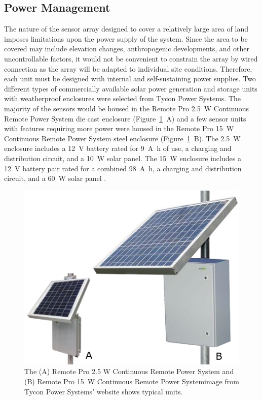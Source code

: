 \documentclass[journal]{IEEEtran}
\begin{document}
\subsection{Power Management}
The nature of the sensor array designed to cover a relatively large area of land imposes limitations upon the power supply of the system.  Since the area to be covered may include elevation changes, anthropogenic developments, and other uncontrollable factors, it would not be convenient to constrain the array by wired connection as the array will be adapted to individual site conditions.  Therefore, each unit must be designed with internal and self-sustaining power supplies.  Two different types of commercially available solar power generation and storage units with weatherproof enclosures were selected from Tycon Power Systems.  The majority of the sensors would be housed in the Remote Pro \SI{2.5}{\watt} Continuous Remote Power System die cast enclosure (Figure~\ref{fig:enclosure}~A) and a few sensor units with features requiring more power were housed in the Remote Pro \SI{15}{\watt} Continuous Remote Power System steel enclosure (Figure~\ref{fig:enclosure}~B).  The \SI{2.5}{\watt} enclosure includes a \SI{12}{\volt} battery rated for \SI{9}{\ampere\hour} of use, a charging and distribution circuit, and a \SI{10}{\watt} solar panel.  The \SI{15}{\watt} enclosure includes a \SI{12}{\volt} battery pair rated for a combined \SI{98}{\ampere\hour}, a charging and distribution circuit, and a \SI{60}{\watt} solar panel \cite{tycon_power_systems_remotepro_2014}.  

\begin{figure}[!t]
	\centering
	\includegraphics[width=\columnwidth,height=0.8\columnwidth,keepaspectratio]{enclosures.png}
	\caption[Tycon Power Systems enclosures]{The (A) Remote Pro 2.5 W Continuous Remote Power System and (B) Remote Pro \SI{15}{\watt} Continuous Remote Power System\textendash{}image from Tycon Power Systems' website shows typical units.}
	\label{fig:enclosure}
\end{figure}
\end{document}
